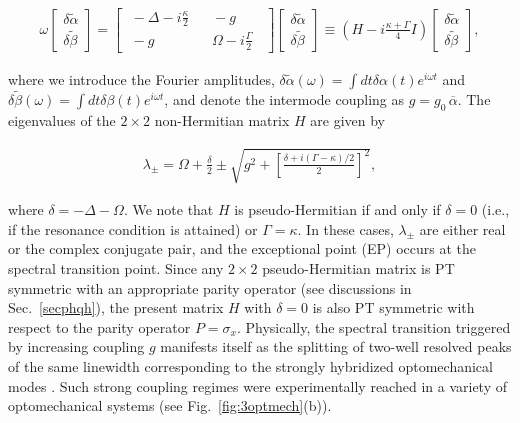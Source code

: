 \documentclass{tADP2e}
\theoremstyle{plain}
\newcommand{\eqn}[1]{
\begin{eqnarray}
	#1
\end{eqnarray}
}
\theoremstyle{plain}
\theoremstyle{definition}
\begin{document}
\eqn{\label{lossyoptmech}
\omega
\begin{bmatrix}
\delta\tilde{\alpha}\\
\delta\tilde{\beta}
\end{bmatrix}=
\begin{bmatrix}
\;-\Delta-i\frac{\kappa}{2}\; & \;\;-g\;\; \\
\;-g\; & \;\;\Omega-i\frac{\Gamma}{2}\;\;
\end{bmatrix}
\begin{bmatrix}
\delta\tilde{\alpha}\\
\delta\tilde{\beta}
\end{bmatrix}\equiv \left(H-i\frac{\kappa+\Gamma}{4}I\right)\begin{bmatrix}
\delta\tilde{\alpha}\\
\delta\tilde{\beta}
\end{bmatrix},
}  
where we introduce the Fourier amplitudes, $\delta\tilde{\alpha}(\omega)=\int dt\delta{\alpha}(t)e^{i\omega t}$ and $\delta\tilde{\beta}(\omega)=\int dt\delta{\beta}(t)e^{i\omega t}$, and denote the intermode coupling as $g=g_0\,\overline{\alpha}$. The eigenvalues of the $2\times 2$ non-Hermitian matrix $H$ are given by
\eqn{\label{lossyoptmechsol}
\lambda_{\pm}=\Omega+\frac{\delta}{2}\pm\sqrt{g^2+\left[\frac{\delta+i(\Gamma-\kappa)/2}{2}\right]^2},
}
where $\delta=-\Delta-\Omega$.
We note that $H$ is pseudo-Hermitian if and only if $\delta=0$ (i.e., if the resonance condition is attained) or $\Gamma=\kappa$. In these cases, $\lambda_{\pm}$ are either real or the complex conjugate pair, and the exceptional point (EP) occurs at the spectral transition point. Since any $2\times 2$ pseudo-Hermitian matrix is PT symmetric with an appropriate parity operator (see discussions in {Sec.~\ref{secphqh}}), the present matrix $H$ with $\delta=0$ is also PT symmetric with respect to the parity operator $P=\sigma_x$. 
Physically, the spectral transition triggered by increasing coupling $g$ manifests itself as the splitting of two-well resolved peaks of the same linewidth corresponding to the strongly hybridized optomechanical modes \cite{MF07,DJM08}. Such strong coupling regimes were experimentally reached in a variety of optomechanical systems \cite{GS09,TJD112,TJD11,VE12} (see Fig.~\ref{fig:3optmech}(b)). 
\end{document}
